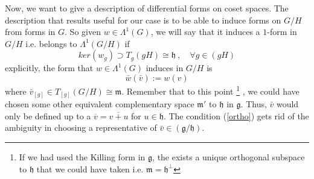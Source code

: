 \documentclass[a4paper,12pt]{article}
\numberwithin{equation}{section}
\numberwithin{thm}{section}
\numberwithin{exm}{section}
\newcommand{\<}{{\langle}}
\renewcommand{\>}{{\rangle}}
\newcommand{\mf}{\mathfrak}
\renewcommand{\L}{{\Lambda}}
\begin{document}
Now, we want to give a description of differential forms on coset spaces. The description that results useful for our case is to be able to induce forms on $G/H$ from forms in $G$. So given $w\in \L^1(G)$, we will say that it induces a $1$-form in $G/H$ i.e. belongs to $\L^1(G/H)$ if
	\begin{equation}\label{ortho}
	ker(w_g) \supset T_g(gH) \cong \mf h\ ,\quad\forall g\in (gH)
	\end{equation}
explicitly, the form that $w\in\L^1(G)$ induces in $G/H$ is
	\begin{equation}
	\bar w (\bar v):= w(v)
	\end{equation}
where $\bar v_{[g]}\in T_{[g]}(G/H)\cong \mf m$. Remember that to this point%
\footnote{If we had used the Killing form in $\mf g$, the exists a unique orthogonal subspace to $\mf h$ that we could have taken i.e. $\mf m = \mf h^\perp$}%
, we could have chosen some other equivalent complementary space $\mf m'$ to $\mf h$ in $\mf g$. Thus, $\bar v$ would only be defined up to a $\overline v = \overline{v+u}$ for $u\in \mf h$. The condition (\ref{ortho}) gets rid of the ambiguity in choosing a representative of $\bar v \in (\mf g/\mf h)$.
\end{document}
